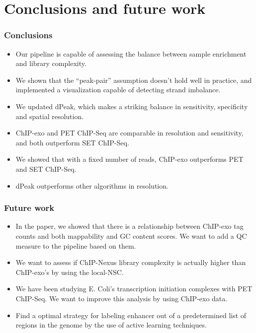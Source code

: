 \documentclass[compress,table,xcolor=dvipsnames]{beamer}\usepackage[]{graphicx}\usepackage[]{color}
\begin{document}
\section{Conclusions and future work}

\begin{frame}
  \frametitle{Conclusions}

  \begin{itemize}
  \item Our pipeline is capable of assessing the balance between
    sample enrichment and library complexity.
  \item We shown that the ``peak-pair'' assumption doesn't hold well
    in practice, and implemented a visualization capable of detecting
    strand imbalance.
  \item We updated dPeak, which makes a striking balance in
    sensitivity, specificity and spatial resolution.
  \item ChIP-exo and PET ChIP-Seq are comparable in resolution and
    sensitivity, and both outperform SET ChIP-Seq.
  \item We showed that with a fixed number of reads, ChIP-exo
    outperforms PET and SET ChIP-Seq.
  \item dPeak outperforms other algorithms in resolution.
  \end{itemize}
\end{frame}


\begin{frame}
\frametitle{Future work}  

\begin{itemize}
\item In the paper, we showed that there is a relationship between
  ChIP-exo tag counts and both mappability and GC content scores. We
  want to add a QC measure to the pipeline based on them.
\item We want to assess if ChIP-Nexus library complexity is actually
  higher than ChIP-exo's by using the $\mbox{local-NSC}$.
\item We have been studying E. Coli's transcription initiation
  complexes with PET ChIP-Seq. We want to improve this analysis by
  using ChIP-exo data.
\item Find a optimal strategy for labeling enhancer out of a
  predetermined list of regions in the genome by the use of active
  learning techniques.
\end{itemize}

\end{frame}
\end{document}
